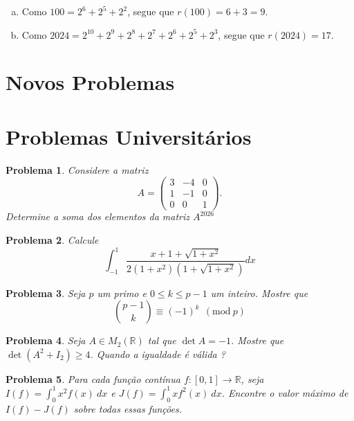 \documentclass{hipatia}
\newtheorem{problem*}{Problema}
\begin{document}
\begin{enumerate}[a)]
\item Como $100 = 2^6 + 2^5 + 2^2$, segue que $r(100) = 6 + 3 = 9$.
\item Como $2024 = 2^{10} + 2^9 + 2^8 + 2^7 + 2^6 + 2^5 + 2^3$, segue que $r(2024) = 17$.
\end{enumerate}




\section{Novos Problemas}



\section*{Problemas Universitários}

\begin{problem*}
Considere a matriz 
\[
A = \begin{pmatrix} 3 & -4 & 0 \\ 1 & -1 & 0 \\ 0 & 0 & 1 \end{pmatrix}.
\] 
Determine a soma dos elementos da matriz \(A^{2026}\)
\end{problem*}


\begin{problem*}
Calcule 
$$\displaystyle \int_{-1}^{1} \frac{x + 1 + \sqrt{1 + x^2}}{2(1 + x^2)\left(1 + \sqrt{1 + x^2}\right)} dx$$
\end{problem*}


\begin{problem*} Seja $p$ um primo e $0 \leq k \leq p-1$ um inteiro. Mostre que $$\binom{p-1}{k} \equiv (-1)^k \ \ (\text{mod} \ p)$$
\end{problem*}



\begin{problem*} Seja $A \in M_2(\mathbb{R})$ tal que $\det A = -1$. Mostre que $\det(A^2 + I_2) \geq 4$. Quando a igualdade é válida ?
\end{problem*}



\begin{problem*} 
Para cada função contínua $f: [0,1] \rightarrow \mathbb{R}$, seja $I(f) = \int_0^1 x^2f(x) \ dx$ e $J(f) = \int_0^1 xf^2(x) \ dx$. Encontre o valor máximo de $I(f) - J(f)$ sobre todas essas funções. 
\end{problem*}
\end{document}
